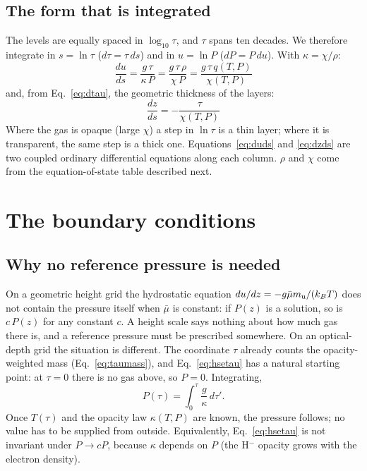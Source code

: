 \subsection{The form that is integrated}
The levels are equally spaced in $\log_{10}\tau$, and $\tau$ spans ten decades. We therefore integrate in $s=\ln\tau$
($d\tau=\tau\,ds$) and in $u=\ln P$ ($dP=P\,du$). With $\kappa=\chi/\rho$:
\begin{equation}
\boxed{\;\frac{du}{ds}=\frac{g\,\tau}{\kappa\,P}=\frac{g\,\tau\,\rho}{\chi\,P}=\frac{g\,\tau\,q(T,P)}{\chi(T,P)}\;}\label{eq:duds}
\end{equation}
and, from Eq.~\eqref{eq:dtau}, the geometric thickness of the layers:
\begin{equation}
\boxed{\;\frac{dz}{ds}=-\frac{\tau}{\chi(T,P)}\;}\label{eq:dzds}
\end{equation}
Where the gas is opaque (large $\chi$) a step in $\ln\tau$ is a thin layer; where it is transparent, the same step is a thick
one. Equations~\eqref{eq:duds} and \eqref{eq:dzds} are two coupled ordinary differential equations along each column. $\rho$
and $\chi$ come from the equation-of-state table described next.



\section{The boundary conditions}\label{sec:bc}
\subsection{Why no reference pressure is needed}\label{sec:noPref}
On a geometric height grid the hydrostatic equation $du/dz=-g\bar\mu m_{\rm u}/(k_BT)$ does not contain the pressure itself
when $\bar\mu$ is constant: if $P(z)$ is a solution, so is $c\,P(z)$ for any constant $c$. A height scale says nothing about
how much gas there is, and a reference pressure must be prescribed somewhere. On an optical-depth grid the situation is
different. The coordinate $\tau$ already counts the opacity-weighted mass (Eq.~\ref{eq:taumass}), and Eq.~\eqref{eq:hsetau}
has a natural starting point: at $\tau=0$ there is no gas above, so $P=0$. Integrating,
\begin{equation}
P(\tau)=\int_0^{\tau}\frac{g}{\kappa}\,d\tau' .\label{eq:Pint}
\end{equation}
Once $T(\tau)$ and the opacity law $\kappa(T,P)$ are known, the pressure follows; no value has to be supplied from outside.
Equivalently, Eq.~\eqref{eq:hsetau} is not invariant under $P\to cP$, because $\kappa$ depends on $P$ (the H$^-$ opacity
grows with the electron density).

